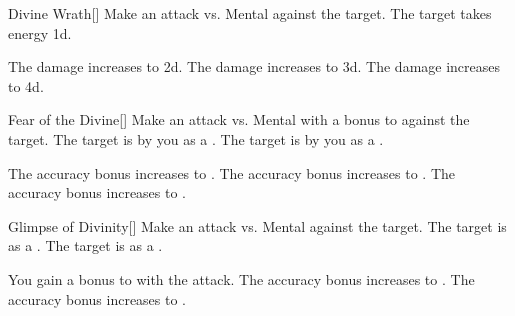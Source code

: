 \lowercase{\hypertarget{spell:Divine Wrath}{}}\label{spell:Divine Wrath}
\begin{freeability}[Rank 1]{\hypertarget{spell:Divine Wrath}{Divine Wrath}}[]
Make an attack vs. Mental against the target.
\hit The target takes energy  \plus1d.

\rankline
{} The damage increases to  \plus2d.
 The damage increases to  \plus3d.
 The damage increases to  \plus4d.
\end{freeability}
\vspace{0.25em}



\lowercase{\hypertarget{spell:Fear of the Divine}{}}\label{spell:Fear of the Divine}
\begin{freeability}[Rank 1]{\hypertarget{spell:Fear of the Divine}{Fear of the Divine}}[]
Make an attack vs. Mental with a  bonus to  against the target.
\hit The target is \shaken by you as a .
\crit The target is  by you as a .

\rankline
{} The accuracy bonus increases to .
 The accuracy bonus increases to .
 The accuracy bonus increases to .
\end{freeability}
\vspace{0.25em}



\lowercase{\hypertarget{spell:Glimpse of Divinity}{}}\label{spell:Glimpse of Divinity}
\begin{freeability}[Rank 1]{\hypertarget{spell:Glimpse of Divinity}{Glimpse of Divinity}}[]
Make an attack vs. Mental against the target.
\hit The target is  as a .
\crit The target is  as a .

\rankline
{} You gain a  bonus to  with the attack.
 The accuracy bonus increases to .
 The accuracy bonus increases to .
\end{freeability}
\vspace{0.25em}



